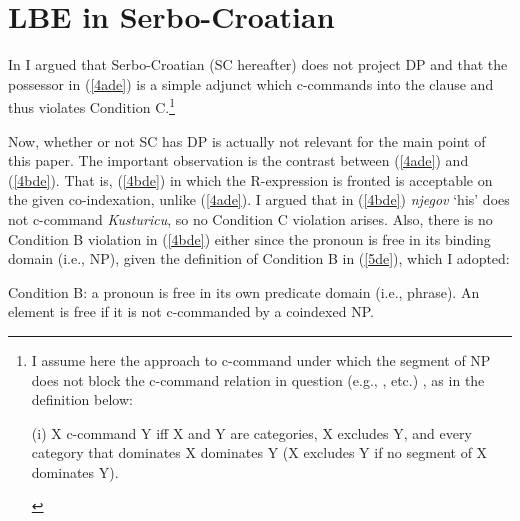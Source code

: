 \documentclass[
    output=paper,
    colorlinks,
    citecolor=brown,
]{langscibook}
\begin{document}
\section{LBE in Serbo-Croatian } \label{s2de}

In \cite{Despic2011,Despic2013} I argued that Serbo-Croatian (SC hereafter) does not project DP and that the possessor in (\ref{4ade}) is a simple adjunct which c-commands into the clause and thus violates Condition C.\footnote{I assume here the approach to c-command under which the segment of NP does not block the c-command relation in question (e.g., \citeauthor{kayne1994}, \citeauthor{Despic2011} \citeyear{Despic2011} etc.) , as in the definition below:
\begin{exe}
\ex (i)	X c-command Y iff X and Y are categories, X excludes Y, and every category that dominates X dominates Y (X excludes Y if no segment of X dominates Y).  
\end{exe}}

\begin{exe}
\ex \label{4de}
\begin{xlist}
\end{xlist}
\end{exe}

Now, whether or not SC has DP is actually not relevant for the main point of this paper. The important observation is the contrast between (\ref{4ade}) and (\ref{4bde}). That is, (\ref{4bde}) in which the R-expression is fronted is acceptable on the given co-indexation, unlike (\ref{4ade}). I argued that in (\ref{4bde}) \textit{njegov} ‘his’ does not c-command \textit{Kusturicu}, so no Condition C violation arises. Also, there is no Condition B violation in (\ref{4bde}) either since the pronoun is free in its binding domain (i.e., NP), given the definition of Condition B in (\ref{5de}), which I adopted:

\begin{exe}
\ex \label{5de}
Condition B: a pronoun is free in its own predicate domain (i.e., phrase). An element is free if it is not c-commanded by a coindexed NP.
\end{exe}
\end{document}
